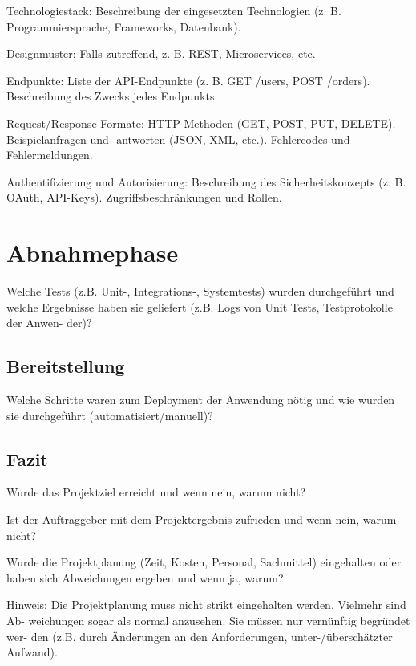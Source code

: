 \documentclass[a4paper,12pt]{article}
\begin{document}
Technologiestack: Beschreibung der eingesetzten Technologien (z. B.
Programmiersprache, Frameworks, Datenbank).

Designmuster: Falls zutreffend, z. B. REST, Microservices, etc. 

Endpunkte: Liste der API-Endpunkte (z. B. GET /users, POST /orders).
Beschreibung des Zwecks jedes Endpunkts.

Request/Response-Formate: HTTP-Methoden (GET, POST, PUT, DELETE).
Beispielanfragen und -antworten (JSON, XML, etc.).  Fehlercodes und
Fehlermeldungen.

Authentifizierung und Autorisierung: Beschreibung des Sicherheitskonzepts (z. B.
OAuth, API-Keys).  Zugriffsbeschränkungen und Rollen.

\newpage \section{Abnahmephase}
Welche Tests (z.B. Unit-, Integrations-,
Systemtests) wurden durchgeführt und welche Ergebnisse haben sie geliefert
(z.B. Logs von Unit Tests, Testprotokolle der Anwen- der)?

\subsection{Bereitstellung}
Welche Schritte waren zum Deployment der Anwendung
nötig und wie wurden sie durchgeführt (automatisiert/manuell)?

\subsection{Fazit}
Wurde das Projektziel erreicht und wenn nein, warum nicht?

Ist der Auftraggeber mit dem Projektergebnis zufrieden und wenn nein, warum
nicht?

Wurde die Projektplanung (Zeit, Kosten, Personal, Sachmittel) eingehalten oder
haben sich Abweichungen ergeben und wenn ja, warum?

Hinweis: Die Projektplanung muss nicht strikt eingehalten werden. Vielmehr sind
Ab- weichungen sogar als normal anzusehen. Sie müssen nur vernünftig begründet
wer- den (z.B. durch Änderungen an den Anforderungen, unter-/überschätzter
Aufwand).

\newpage
\printbibliography
\end{document}
